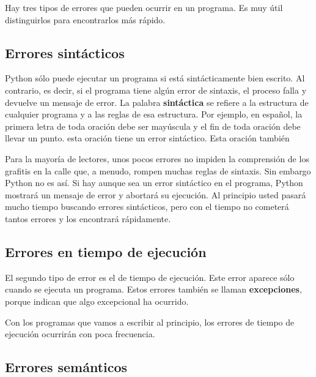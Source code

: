 Hay tres tipos de errores que pueden ocurrir en un programa. Es muy
útil distinguirlos para encontrarlos más rápido.

\subsection{Errores sintácticos}

 

Python sólo puede ejecutar un programa si está sintácticamente bien
escrito. Al contrario, es decir, si el programa tiene algún error
de sintaxis, el proceso falla y devuelve un mensaje de error. La palabra
\textbf{sintáctica} se refiere a la estructura de cualquier programa
y a las reglas de esa estructura.  Por ejemplo,
en español, la primera letra de toda oración debe ser mayúscula y
el fin de toda oración debe llevar un punto. esta oración tiene un
error sintáctico. Esta oración también

Para la mayoría de lectores, unos pocos errores no impiden la comprensión
de los grafitis en la calle que, a menudo, rompen muchas reglas de
sintaxis. Sin embargo Python no es así. Si hay aunque sea un error
sintáctico en el programa, Python mostrará un mensaje de error y abortará
su ejecución. Al principio usted pasará mucho tiempo buscando errores
sintácticos, pero con el tiempo no cometerá tantos errores y los encontrará
rápidamente.

\subsection{Errores en tiempo de ejecución}

\label{runtime}  
  

El segundo tipo de error es el de tiempo de ejecución. Este error
aparece sólo cuando se ejecuta un programa. Estos errores también
se llaman \textbf{excepciones}, porque indican que algo excepcional
ha ocurrido.

Con los programas que vamos a escribir al principio, los errores de
tiempo de ejecución ocurrirán con poca frecuencia.

\subsection{Errores semánticos}


